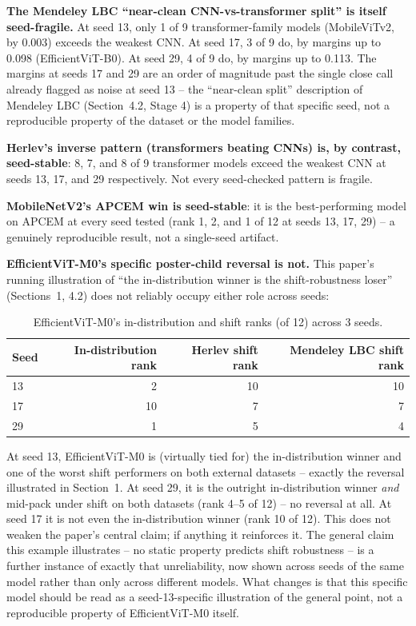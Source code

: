 \documentclass[runningheads]{llncs}
\begin{document}
\textbf{The Mendeley LBC ``near-clean CNN-vs-transformer split'' is
itself seed-fragile.} At seed 13, only 1 of 9 transformer-family models
(MobileViTv2, by 0.003) exceeds the weakest CNN. At seed 17, 3 of 9 do,
by margins up to 0.098 (EfficientViT-B0). At seed 29, 4 of 9 do, by
margins up to 0.113. The margins at seeds 17 and 29 are an order of
magnitude past the single close call already flagged as noise at seed 13
-- the ``near-clean split'' description of Mendeley LBC (Section~4.2,
Stage 4) is a property of that specific seed, not a reproducible property
of the dataset or the model families.

\textbf{Herlev's inverse pattern (transformers beating CNNs) is, by
contrast, seed-stable}: 8, 7, and 8 of 9 transformer models exceed the
weakest CNN at seeds 13, 17, and 29 respectively. Not every seed-checked
pattern is fragile.

\textbf{MobileNetV2's APCEM win is seed-stable}: it is the best-performing
model on APCEM at every seed tested (rank 1, 2, and 1 of 12 at seeds 13,
17, 29) -- a genuinely reproducible result, not a single-seed artifact.

\textbf{EfficientViT-M0's specific poster-child reversal is not.} This
paper's running illustration of ``the in-distribution winner is the
shift-robustness loser'' (Sections~1, 4.2) does not reliably occupy
either role across seeds:

\begin{table}[htbp]
\centering
\caption{EfficientViT-M0's in-distribution and shift ranks (of 12) across 3 seeds.}
\label{tab:seedcheck-effvitm0}
\begin{tabular}{lrrr}
\toprule
Seed & In-distribution rank & Herlev shift rank & Mendeley LBC shift rank \\
\midrule
13 & 2 & 10 & 10 \\
17 & 10 & 7 & 7 \\
29 & 1 & 5 & 4 \\
\bottomrule
\end{tabular}
\end{table}

At seed 13, EfficientViT-M0 is (virtually tied for) the in-distribution
winner and one of the worst shift performers on both external datasets --
exactly the reversal illustrated in Section~1. At seed 29, it is the
outright in-distribution winner \emph{and} mid-pack under shift on both
datasets (rank 4--5 of 12) -- no reversal at all. At seed 17 it is not
even the in-distribution winner (rank 10 of 12). This does not weaken the
paper's central claim; if anything it reinforces it. The general claim
this example illustrates -- no static property predicts shift robustness
-- is a further instance of exactly that unreliability, now shown across
seeds of the same model rather than only across different models. What
changes is that this specific model should be read as a seed-13-specific
illustration of the general point, not a reproducible property of
EfficientViT-M0 itself.
\end{document}
